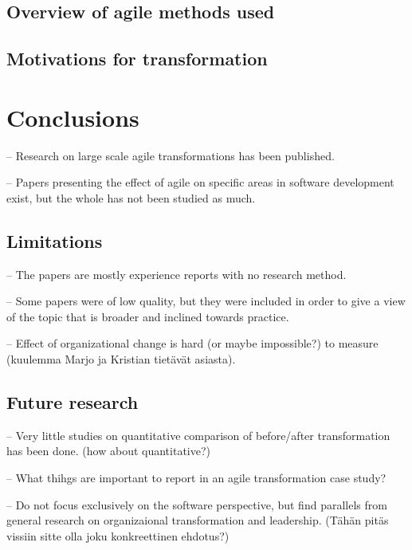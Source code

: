 \documentclass[lnbip]{svmultln}
\begin{document}
\subsection{Overview of agile methods used}

\lipsum[1]

\subsection{Motivations for transformation}

\lipsum[1]


\section{Conclusions}
\label{sec:conclusions}

-- Research on large scale agile transformations has been published.

-- Papers presenting the effect of agile on specific areas in software
development exist, but the whole has not been studied as much.

\subsection{Limitations}

-- The papers are mostly experience reports with no research method.

-- Some papers were of low quality, but they were included in order to give a
view of the topic that is broader and inclined towards practice.

-- Effect of organizational change is hard (or maybe impossible?) to measure
(kuulemma Marjo ja Kristian tietävät asiasta).

\subsection{Future research}

-- Very little studies on quantitative comparison of before/after transformation
has been done. (how about quantitative?)

-- What thihgs are important to report in an agile transformation case study?

-- Do not focus exclusively on the software perspective, but find parallels from
general research on organizaional transformation and leadership. (Tähän pitäs
vissiin sitte olla joku konkreettinen ehdotus?)

\lipsum[1]






\end{document}
